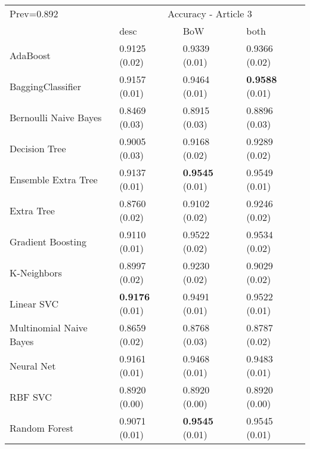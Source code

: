 \begin{tabular}{|l|l|l|l| }
\hline
Prev=0.892 &  \multicolumn{3}{c|}{Accuracy - Article 3} \\
\cline{2-4} & desc & BoW & both \\ \hline
AdaBoost                & 0.9125 (0.02) & 0.9339 (0.01) & 0.9366 (0.02)\\
BaggingClassifier       & 0.9157 (0.01) & 0.9464 (0.01) & {\bf 0.9588} (0.01)\\
Bernoulli Naive Bayes   & 0.8469 (0.03) & 0.8915 (0.03) & 0.8896 (0.03)\\
Decision Tree           & 0.9005 (0.03) & 0.9168 (0.02) & 0.9289 (0.02)\\
Ensemble Extra Tree     & 0.9137 (0.01) & {\bf 0.9545} (0.01) & 0.9549 (0.01)\\
Extra Tree              & 0.8760 (0.02) & 0.9102 (0.02) & 0.9246 (0.02)\\
Gradient Boosting       & 0.9110 (0.01) & 0.9522 (0.02) & 0.9534 (0.02)\\
K-Neighbors             & 0.8997 (0.02) & 0.9230 (0.02) & 0.9029 (0.02)\\
Linear SVC              & {\bf 0.9176} (0.01) & 0.9491 (0.01) & 0.9522 (0.01)\\
Multinomial Naive Bayes & 0.8659 (0.02) & 0.8768 (0.03) & 0.8787 (0.02)\\
Neural Net              & 0.9161 (0.01) & 0.9468 (0.01) & 0.9483 (0.01)\\
RBF SVC                 & 0.8920 (0.00) & 0.8920 (0.00) & 0.8920 (0.00)\\
Random Forest           & 0.9071 (0.01) & {\bf 0.9545} (0.01) & 0.9545 (0.01)\\
\hline
\end{tabular}